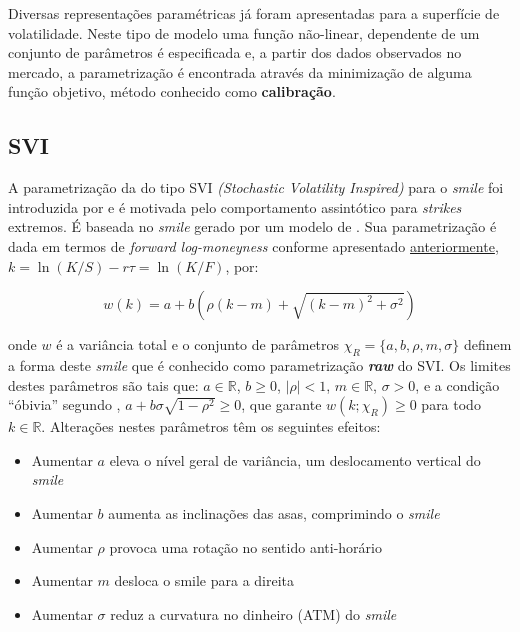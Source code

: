 \documentclass[]{book}
\providecommand{\tightlist}{%
  \setlength{\itemsep}{0pt}\setlength{\parskip}{0pt}}
\theoremstyle{definition}
\theoremstyle{definition}
\theoremstyle{definition}
\theoremstyle{remark}
\begin{document}
Diversas representações paramétricas já foram apresentadas para a
superfície de volatilidade. Neste tipo de modelo uma função não-linear,
dependente de um conjunto de parâmetros é especificada e, a partir dos
dados observados no mercado, a parametrização é encontrada através da
minimização de alguma função objetivo, método conhecido como
\textbf{calibração}.

\subsection{SVI}\label{sec:svi}

A parametrização da do tipo SVI \emph{(Stochastic Volatility Inspired)}
para o \emph{smile} foi introduzida por \citet{Gatheral2004} e é
motivada pelo comportamento assintótico para \emph{strikes} extremos. É
baseada no \emph{smile} gerado por um modelo de \citet{Heston1993}. Sua
parametrização é dada em termos de \emph{forward log-moneyness} conforme
apresentado \protect\hyperlink{smile}{anteriormente},
\(k=\ln(K/S)-r\tau=\ln(K/F)\), por:

\begin{equation}
w(k) = a + b\left(\rho(k-m)+\sqrt{(k-m)^2 + \sigma^2}\right)
\label{eq:rawsvi}
\end{equation}

onde \(w\) é a variância total e o conjunto de parâmetros
\(\chi_R = \{a, b, \rho, m, \sigma\}\) definem a forma deste
\emph{smile} que é conhecido como parametrização \textbf{\emph{raw}} do
SVI. Os limites destes parâmetros são tais que: \(a \in \mathbb R\),
\(b \geq 0\), \(|\rho| < 1\), \(m \in \mathbb R\), \(\sigma > 0\), e a
condição ``óbivia'' segundo \citet{Gatheral2014},
\(a+b \sigma\sqrt{1 − \rho^2} \geq 0\), que garante
\(w(k; \chi_R) \geq 0\) para todo \(k \in \mathbb R\). Alterações nestes
parâmetros têm os seguintes efeitos:

\begin{itemize}
\tightlist
\item
  Aumentar \(a\) eleva o nível geral de variância, um deslocamento
  vertical do \emph{smile}
\item
  Aumentar \(b\) aumenta as inclinações das asas, comprimindo o
  \emph{smile}
\item
  Aumentar \(\rho\) provoca uma rotação no sentido anti-horário
\item
  Aumentar \(m\) desloca o smile para a direita
\item
  Aumentar \(\sigma\) reduz a curvatura no dinheiro (ATM) do
  \emph{smile}
\end{itemize}
\end{document}
